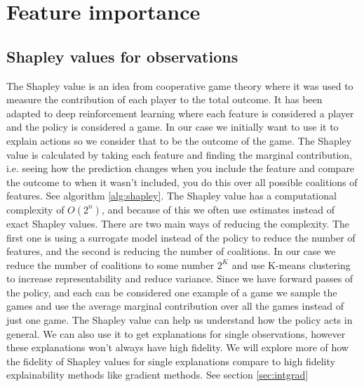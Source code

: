 \documentclass[UKenglish]{uiomasterthesis}
\begin{document}
\section{Feature importance}

\subsection{Shapley values for observations}
The Shapley value is an idea from cooperative game theory where it was used to measure the contribution of each player to the total outcome. It has been adapted to deep reinforcement learning where each feature is considered a player and the policy is considered a game. In our case we initially want to use it to explain actions so we consider that to be the outcome of the game. The Shapley value is calculated by taking each feature and finding the marginal contribution, i.e. seeing how the prediction changes when you include the feature and compare the outcome to when it wasn't included, you do this over all possible coalitions of features. See algorithm \ref{alg:shapley}.
The Shapley value has a computational complexity of $O(2^n)$, and because of this we often use estimates instead of exact Shapley values. There are two main ways of reducing the complexity. The first one is using a surrogate model instead of the policy to reduce the number of features, and the second is reducing the number of coalitions. In our case we reduce the number of coalitions to some number $2^K$ and use K-means clustering to increase representability and reduce variance.
Since we have forward passes of the policy, and each can be considered one example of a game we sample the games and use the average marginal contribution over all the games instead of just one game.
The Shapley value can help us understand how the policy acts in general. We can also use it to get explanations for single observations, however these explanations won't always have high fidelity. We will explore more of how the fidelity of Shapley values for single explanations compare to high fidelity explainability methods like gradient methods. See section \ref{sec:intgrad}
\end{document}
